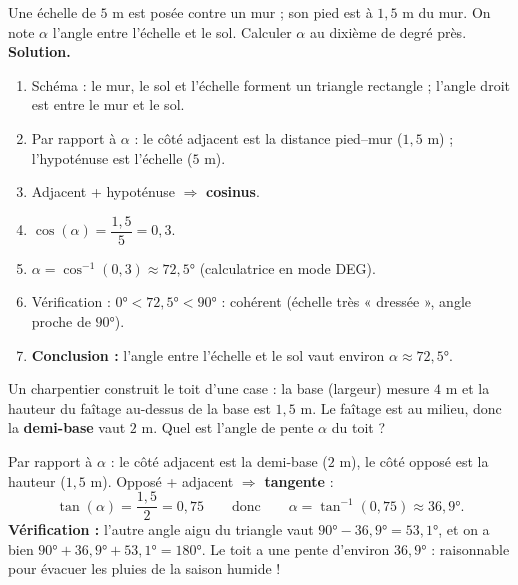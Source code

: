 \documentclass[11pt]{article}
\begin{document}
\begin{exoresolu}
Une échelle de $5$ m est posée contre un mur ; son pied est à $1,5$ m du mur. On note $\alpha$ l'angle entre l'échelle et le sol. Calculer $\alpha$ au dixième de degré près.
\tcblower
\textbf{Solution.}
\begin{enumerate}
  \item Schéma : le mur, le sol et l'échelle forment un triangle rectangle ; l'angle droit est entre le mur et le sol.
  \item Par rapport à $\alpha$ : le côté adjacent est la distance pied--mur ($1,5$ m) ; l'hypoténuse est l'échelle ($5$ m).
  \item Adjacent + hypoténuse $\Rightarrow$ \textbf{cosinus}.
  \item $\cos(\alpha) = \dfrac{1,5}{5} = 0,3$.
  \item $\alpha = \cos^{-1}(0,3) \approx 72,5°$ (calculatrice en mode DEG).
  \item Vérification : $0° < 72,5° < 90°$ : cohérent (échelle très « dressée », angle proche de $90°$).
  \item \textbf{Conclusion :} l'angle entre l'échelle et le sol vaut environ $\alpha \approx 72,5°$.
\end{enumerate}
\end{exoresolu}

\begin{exemplebox}
Un charpentier construit le toit d'une case : la base (largeur) mesure $4$ m et la hauteur du faîtage au-dessus de la base est $1,5$ m. Le faîtage est au milieu, donc la \textbf{demi-base} vaut $2$ m. Quel est l'angle de pente $\alpha$ du toit ?

Par rapport à $\alpha$ : le côté adjacent est la demi-base ($2$ m), le côté opposé est la hauteur ($1,5$ m). Opposé + adjacent $\Rightarrow$ \textbf{tangente} :
\[ \tan(\alpha) = \frac{1,5}{2} = 0,75 \qquad\text{donc}\qquad \alpha = \tan^{-1}(0,75) \approx 36,9°. \]
\textbf{Vérification :} l'autre angle aigu du triangle vaut $90° - 36,9° = 53,1°$, et on a bien $90° + 36,9° + 53,1° = 180°$. Le toit a une pente d'environ $36,9°$ : raisonnable pour évacuer les pluies de la saison humide !
\end{exemplebox}
\end{document}
